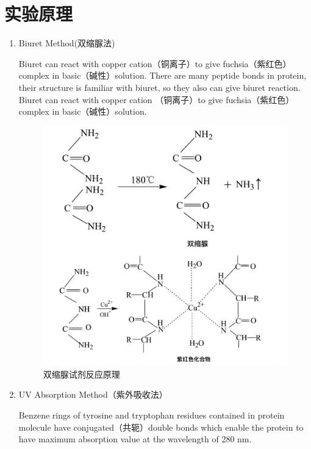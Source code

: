 \documentclass[UTF8]{ctexart}
\begin{document}
\section{实验原理}
\begin{enumerate}
    \item Biuret Method(双缩脲法)

    
    Biuret can react with copper cation（铜离子）to give fuchsia（紫红色）complex in basic（碱性）solution. There are many peptide bonds in protein, their structure is familiar with biuret, so they also can give biuret reaction. Biuret can react with copper cation （铜离子）to give fuchsia（紫红色）complex in basic（碱性）solution.

\begin{figure}[H]
  \centering
  \includegraphics[scale = 0.5]{1.png} %
  \caption{双缩脲试剂反应原理}
  \label{fig:example}
\end{figure}

    \item UV Absorption Method（紫外吸收法）
    
    Benzene rings of tyrosine and tryptophan residues contained in protein molecule have conjugated（共轭）double bonds which enable the protein to have maximum absorption value at the wavelength of 280 nm.
\end{enumerate}
\end{document}
